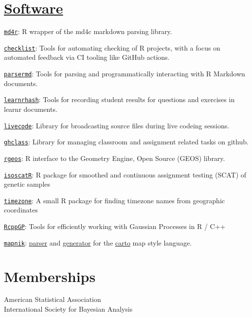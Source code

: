 \documentclass[margin,line]{res}
\begin{document}
\begin{resume}
\vspace{4mm}

\section{\sc \href{https://github.com/rundel/}{Software}}

\href{https://github.com/rundel/md4r}{\texttt{md4r}}: R wrapper of the md4c markdown parsing library.

\href{https://github.com/rundel/checklist}{\texttt{checklist}}: Tools for automating checking of R projects, with a focus on automated feedback via CI tooling like GitHub actions.

\href{https://github.com/rundel/parsermd}{\texttt{parsermd}}: Tools for parsing and programmatically interacting with R Markdown documents.

\href{https://github.com/rundel/learnrhash}{\texttt{learnrhash}}: Tools for recording student results for questions and exercises in learnr documents.

\href{https://github.com/rundel/livecode}{\texttt{livecode}}: Library for broadcasting source files during live codeing sessions.

\href{https://github.com/rundel/ghclass}{\texttt{ghclass}}: Library for managing classroom and assignment related tasks on github.

\href{https://github.com/rundel/rgeos}{\texttt{rgeos}}: R interface to the Geometry Engine, Open Source (GEOS) library.

\vspace{-0.15cm}
\href{https://github.com/rundel/isoscatR}{\texttt{isoscatR}}: R package for smoothed and continuous assignment testing (SCAT) of genetic samples

\vspace{-0.15cm}
\href{https://github.com/rundel/timezone}{\texttt{timezone}}: A small R package for finding timezone names from geographic coordinates

\vspace{-0.15cm}
\href{https://github.com/rundel/RcppGP}{\texttt{RcppGP}}: Tools for efficiently working with Gaussian Processes in R / C++

\vspace{-0.15cm}
\href{http://mapnik.org}{\texttt{mapnik}}: \href{https://github.com/rundel/carto-parser}{parser} and \href{https://github.com/rundel/carto-generator}{generator} for the \href{https://github.com/mapbox/carto}{carto} map style language.

\vspace{4mm}

\section{\sc Memberships}
American Statistical Association \\
International Society for Bayesian Analysis

\end{resume}
\end{document}
